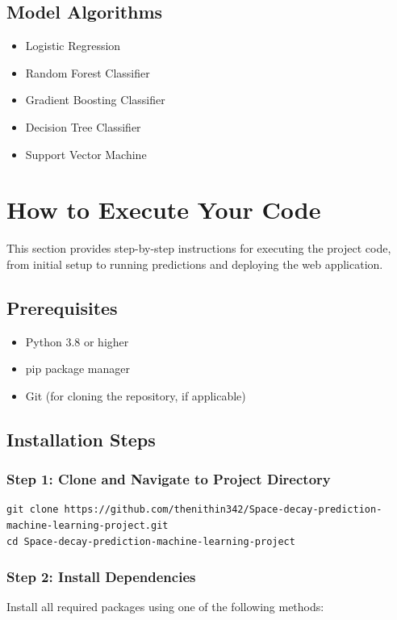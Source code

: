 \documentclass[12pt,a4paper]{article}
\begin{document}
\subsection{Model Algorithms}
\begin{itemize}
    \item Logistic Regression
    \item Random Forest Classifier
    \item Gradient Boosting Classifier
    \item Decision Tree Classifier
    \item Support Vector Machine
\end{itemize}

\section{How to Execute Your Code}

This section provides step-by-step instructions for executing the project code, from initial setup to running predictions and deploying the web application.

\subsection{Prerequisites}
\begin{itemize}
    \item Python 3.8 or higher
    \item pip package manager
    \item Git (for cloning the repository, if applicable)
\end{itemize}

\subsection{Installation Steps}

\subsubsection{Step 1: Clone and Navigate to Project Directory}
\begin{verbatim}
git clone https://github.com/thenithin342/Space-decay-prediction-machine-learning-project.git
cd Space-decay-prediction-machine-learning-project
\end{verbatim}

\subsubsection{Step 2: Install Dependencies}
Install all required packages using one of the following methods:
\end{document}
